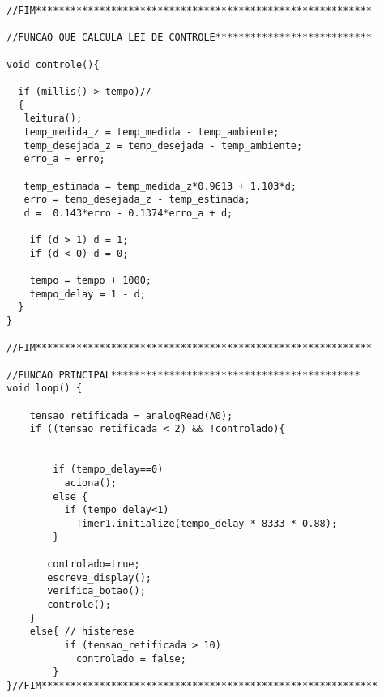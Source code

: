 \begin{lstlisting}
//FIM**********************************************************

//FUNCAO QUE CALCULA LEI DE CONTROLE***************************
  
void controle(){
  
  if (millis() > tempo)// 
  {
   leitura();
   temp_medida_z = temp_medida - temp_ambiente;
   temp_desejada_z = temp_desejada - temp_ambiente;
   erro_a = erro;
 
   temp_estimada = temp_medida_z*0.9613 + 1.103*d;
   erro = temp_desejada_z - temp_estimada;     
   d =  0.143*erro - 0.1374*erro_a + d;
   
    if (d > 1) d = 1;
    if (d < 0) d = 0;
    
    tempo = tempo + 1000;
    tempo_delay = 1 - d;
  }
}

//FIM**********************************************************

//FUNCAO PRINCIPAL*******************************************
void loop() {
   
    tensao_retificada = analogRead(A0); 
    if ((tensao_retificada < 2) && !controlado){ 
        
        
        if (tempo_delay==0) 
          aciona();
        else {
          if (tempo_delay<1)  
            Timer1.initialize(tempo_delay * 8333 * 0.88);
        }

       controlado=true;
       escreve_display();
       verifica_botao();
       controle();                  
    } 
	else{ // histerese
          if (tensao_retificada > 10) 
            controlado = false;
        }
}//FIM**********************************************************
\end{lstlisting}